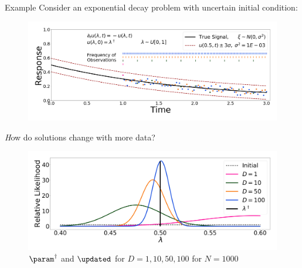 \begin{block}{Example}
\centering
    Consider an exponential decay problem with uncertain initial condition:
\vspace{-0.5cm}
    \begin{figure}
        \includegraphics[width=26cm]{exponential_decay_response_sigma-10E-4}
    \end{figure}


\vspace{1cm}

\centering
{}
{\emph How do solutions change with more data?}
\vspace{-0.5cm}
    \begin{figure}
        \includegraphics[width=26cm]{updated_convergence_sigma-10E-4}
        \vspace{-0.5cm}
        \caption*{ $\param^\dagger$ and $\updated$ for $D=1, 10, 50, 100$ for $N=1000$}
    \end{figure}


\vspace{1cm}


\end{block}
